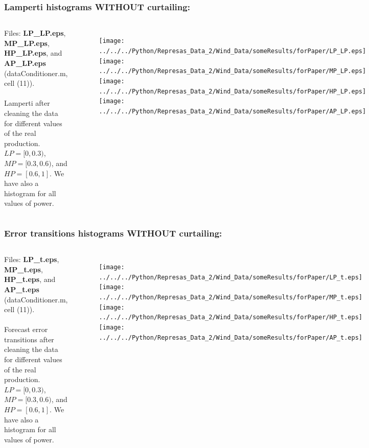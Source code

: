 \documentclass[aspectratio=169]{beamer}\usepackage[utf8]{inputenc}
\begin{document}

\begin{frame}\frametitle{Lamperti histograms WITHOUT curtailing:}

\begin{columns}

Files: \textbf{LP\_LP.eps}, \textbf{MP\_LP.eps}, \textbf{HP\_LP.eps}, and \textbf{AP\_LP.eps} (dataConditioner.m, cell (11)).\\
\quad\\
Lamperti after cleaning the data for different values of the real production. $LP=[0,0.3)$, $MP=[0.3,0.6)$, and $HP=[0.6,1]$. We have also a histogram for all values of power.

\begin{figure}[ht!]
\centering
\texttt{[image: ../../../Python/Represas\_Data\_2/Wind\_Data/someResults/forPaper/LP\_LP.eps]}
\texttt{[image: ../../../Python/Represas\_Data\_2/Wind\_Data/someResults/forPaper/MP\_LP.eps]}
\texttt{[image: ../../../Python/Represas\_Data\_2/Wind\_Data/someResults/forPaper/HP\_LP.eps]}\texttt{[image: ../../../Python/Represas\_Data\_2/Wind\_Data/someResults/forPaper/AP\_LP.eps]}
\end{figure}

\end{columns}

\end{frame}


\begin{frame}\frametitle{Error transitions histograms WITHOUT curtailing:}

\begin{columns}

Files: \textbf{LP\_t.eps}, \textbf{MP\_t.eps}, \textbf{HP\_t.eps}, and \textbf{AP\_t.eps} (dataConditioner.m, cell (11)).\\
\quad\\
Forecast error transitions after cleaning the data for different values of the real production. $LP=[0,0.3)$, $MP=[0.3,0.6)$, and $HP=[0.6,1]$. We have also a histogram for all values of power.

\begin{figure}[ht!]
\centering
\texttt{[image: ../../../Python/Represas\_Data\_2/Wind\_Data/someResults/forPaper/LP\_t.eps]}
\texttt{[image: ../../../Python/Represas\_Data\_2/Wind\_Data/someResults/forPaper/MP\_t.eps]}
\texttt{[image: ../../../Python/Represas\_Data\_2/Wind\_Data/someResults/forPaper/HP\_t.eps]}\texttt{[image: ../../../Python/Represas\_Data\_2/Wind\_Data/someResults/forPaper/AP\_t.eps]}
\end{figure}

\end{columns}

\end{frame}
\end{document}
